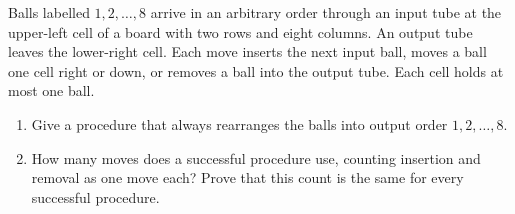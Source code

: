 Balls labelled $1,2,\ldots,8$ arrive in an arbitrary order through an input tube at the upper-left cell of a board with two rows and eight columns. An output tube leaves the lower-right cell. Each move inserts the next input ball, moves a ball one cell right or down, or removes a ball into the output tube. Each cell holds at most one ball.
\begin{enumerate}
\item Give a procedure that always rearranges the balls into output order $1,2,\ldots,8$.
\item How many moves does a successful procedure use, counting insertion and removal as one move each? Prove that this count is the same for every successful procedure.
\end{enumerate}
